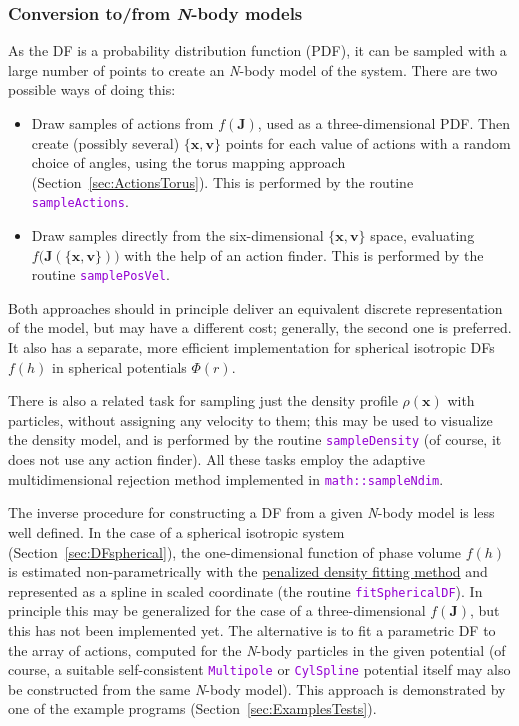 \documentclass[12pt]{article}
\newcommand{\Nbody}{\textsl{N}-body\xspace}
\newcommand{\ttt}[1]{\textcolor{darkviolet}{\texttt{#1}}}
\newcommand{\bv}{\boldsymbol{v}}
\newcommand{\bx}{\boldsymbol{x}}
\newcommand{\bJ}{\boldsymbol{J}}
\begin{document}
\subsubsection{Conversion to/from \Nbody models}  \label{sec:Nbody}

As the DF is a probability distribution function (PDF), it can be sampled with a large number of points to create an \Nbody model of the system. There are two possible ways of doing this:
\begin{itemize}  \setlength{\parskip}{2pt} \setlength{\itemsep}{2pt}
\item Draw samples of actions from $f(\bJ)$, used as a three-dimensional PDF. Then create (possibly several) $\{\bx,\bv\}$ points for each value of actions with a random choice of angles, using the torus mapping approach (Section~\ref{sec:ActionsTorus}). This is performed by the routine \ttt{sampleActions}.
\item Draw samples directly from the six-dimensional $\{\bx,\bv\}$ space, evaluating $f\big(\bJ(\{\bx,\bv\})\big)$ with the help of an action finder. This is performed by the routine \ttt{samplePosVel}.
\end{itemize}
Both approaches should in principle deliver an equivalent discrete representation of the model, but may have a different cost; generally, the second one is preferred. It also has a separate, more efficient implementation for spherical isotropic DFs $f(h)$ in spherical potentials $\Phi(r)$.

There is also a related task for sampling just the density profile $\rho(\bx)$ with particles, without assigning any velocity to them; this may be used to visualize the density model, and is performed by the routine \ttt{sampleDensity} (of course, it does not use any action finder). All these tasks employ the adaptive multidimensional rejection method implemented in \ttt{math::sampleNdim}.

The inverse procedure for constructing a DF from a given \Nbody model is less well defined. In the case of a spherical isotropic system (Section~\ref{sec:DFspherical}), the one-dimensional function of phase volume $f(h)$ is estimated non-parametrically with the \hyperref[sec:SplineFitting]{penalized density fitting method} and represented as a spline in scaled coordinate (the routine \ttt{fitSphericalDF}). In principle this may be generalized for the case of a three-dimensional $f(\bJ)$, but this has not been implemented yet. The alternative is to fit a parametric DF to the array of actions, computed for the \Nbody particles in the given potential (of course, a suitable self-consistent \ttt{Multipole} or \ttt{CylSpline} potential itself may also be constructed from the same \Nbody model). This approach is demonstrated by one of the example programs (Section~\ref{sec:ExamplesTests}).
\end{document}
